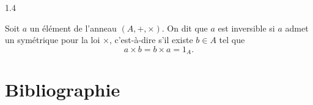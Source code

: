\documentclass{article}
\begin{document}
\begin{spacing}{1.4}
\begin{tcolorbox}[colframe=blue!75!black,colback=blue!5!white,title=Définition - Éléments inverses d'un anneau]
Soit $a$ un élément de l'anneau $(A,+,\times)$. On dit que $a$ est inversible si $a$ admet un symétrique pour la loi $\times$, c'est-à-dire s'il existe $b\in A$ tel que
\[
a\times b = b\times a = 1_A.
\]
\end{tcolorbox}
\end{spacing}

\newpage
\section{Bibliographie}
\printbibliography
\end{document}
